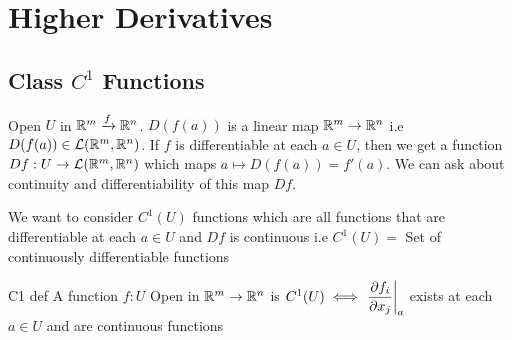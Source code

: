 \chapter{Higher Derivatives}
\section{Class \texorpdfstring{$C^1$}{C1} Functions}
Open $U$ in $\mathbb{R}^m\xrightarrow{f}\mathbb{R}^n$. $D(f(a))$ is a linear map $\mathbb{R}^m\to \mathbb{R}^n$ i.e $D(f(a))\in \mathcal{L}(\mathbb{R}^m,\mathbb{R}^n)$. If $f$ is differentiable at each $a\in U$, then we get a function $Df:{U\to\mathcal{L}(\mathbb{R}^m,\mathbb{R}^n)}$  which maps $a\longmapsto D(f(a))=f'(a)$. We can ask about continuity and differentiability of this map $Df$.

We want to consider $C^1(U)$ functions which are all functions that are differentiable at each $a\in U$ and $Df$ is continuous i.e $C^1(U)=$ Set of continuously differentiable functions
\begin{Theorem}{}{C1 def}
	A function $f:U$ Open in $\mathbb{R}^m\to \mathbb{R}^n$ is $C^1(U)\iff \left.\dfrac{\partial f_i}{\partial x_j}\right|_a$ exists at each $a\in U$ and are continuous functions
\end{Theorem}
